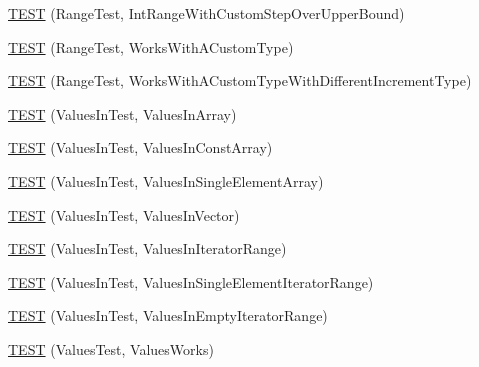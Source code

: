 \begin{DoxyCompactItemize}
\item 
\mbox{\hyperlink{_obj__test_2lib_2googletest-master_2googletest_2test_2googletest-param-test-test_8cc_a87b9e66f957ddc505fc81cb14fd72339}{T\+E\+ST}} (Range\+Test, Int\+Range\+With\+Custom\+Step\+Over\+Upper\+Bound)
\item 
\mbox{\hyperlink{_obj__test_2lib_2googletest-master_2googletest_2test_2googletest-param-test-test_8cc_ae3c8adabec91bd63fd719e116c279eac}{T\+E\+ST}} (Range\+Test, Works\+With\+A\+Custom\+Type)
\item 
\mbox{\hyperlink{_obj__test_2lib_2googletest-master_2googletest_2test_2googletest-param-test-test_8cc_a88be7527c7d77f3c89f80d84c80fd405}{T\+E\+ST}} (Range\+Test, Works\+With\+A\+Custom\+Type\+With\+Different\+Increment\+Type)
\item 
\mbox{\hyperlink{_obj__test_2lib_2googletest-master_2googletest_2test_2googletest-param-test-test_8cc_abfcf3f3f6fcd742e3e85daf552f02b40}{T\+E\+ST}} (Values\+In\+Test, Values\+In\+Array)
\item 
\mbox{\hyperlink{_obj__test_2lib_2googletest-master_2googletest_2test_2googletest-param-test-test_8cc_aeeb7ce0b55e6d2cfc439149470c7af16}{T\+E\+ST}} (Values\+In\+Test, Values\+In\+Const\+Array)
\item 
\mbox{\hyperlink{_obj__test_2lib_2googletest-master_2googletest_2test_2googletest-param-test-test_8cc_ada74720d1b4b4c63cf08033f4509561b}{T\+E\+ST}} (Values\+In\+Test, Values\+In\+Single\+Element\+Array)
\item 
\mbox{\hyperlink{_obj__test_2lib_2googletest-master_2googletest_2test_2googletest-param-test-test_8cc_a562952744cd40b914d6547e83003c257}{T\+E\+ST}} (Values\+In\+Test, Values\+In\+Vector)
\item 
\mbox{\hyperlink{_obj__test_2lib_2googletest-master_2googletest_2test_2googletest-param-test-test_8cc_a231a43db61584a3f11662bdc78b6cc77}{T\+E\+ST}} (Values\+In\+Test, Values\+In\+Iterator\+Range)
\item 
\mbox{\hyperlink{_obj__test_2lib_2googletest-master_2googletest_2test_2googletest-param-test-test_8cc_a38f446e378a9ff60bd6a1df2d533a1df}{T\+E\+ST}} (Values\+In\+Test, Values\+In\+Single\+Element\+Iterator\+Range)
\item 
\mbox{\hyperlink{_obj__test_2lib_2googletest-master_2googletest_2test_2googletest-param-test-test_8cc_aed44e3d25084500088fb9cb99e189939}{T\+E\+ST}} (Values\+In\+Test, Values\+In\+Empty\+Iterator\+Range)
\item 
\mbox{\hyperlink{_obj__test_2lib_2googletest-master_2googletest_2test_2googletest-param-test-test_8cc_ad859819e6b2a7ec58c4fd509b5cfc26c}{T\+E\+ST}} (Values\+Test, Values\+Works)

\end{DoxyCompactItemize}
